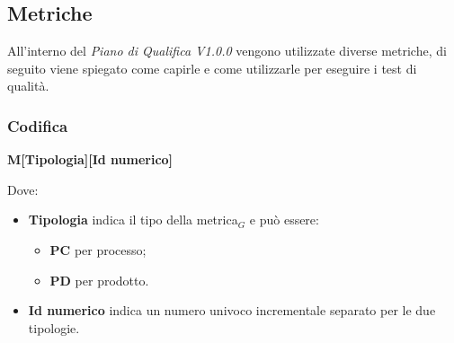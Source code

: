   \subsection{Metriche}\label{sec:Metriche}
  All'interno del \textit{Piano di Qualifica V1.0.0} vengono utilizzate diverse metriche, di seguito viene spiegato come capirle e come utilizzarle per
  eseguire i test di qualità.
  \subsubsection{Codifica}
  \begin{center}
      \textbf{M[Tipologia][Id numerico]}
  \end{center}
  Dove:
    \begin{itemize}
        \item \textbf{Tipologia} indica il tipo della metrica$_G$ e può essere:
                \begin{itemize}
                    \item \textbf{PC} per processo;
                    \item \textbf{PD} per prodotto.
                \end{itemize}
        \item \textbf{Id numerico} indica un numero univoco incrementale separato per le due tipologie.
    \end{itemize}
